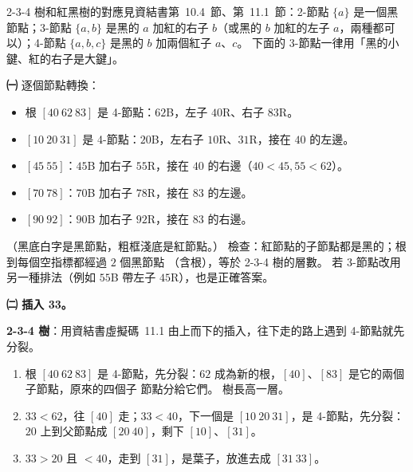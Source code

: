 \begin{pastsoln}
2-3-4 樹和紅黑樹的對應見資結書第~10.4~節、第~11.1~節：2-節點 $\{a\}$ 是一個黑節點；3-節點 $\{a, b\}$ 是黑的
$a$ 加紅的右子 $b$（或黑的 $b$ 加紅的左子 $a$，兩種都可以）；4-節點 $\{a, b, c\}$ 是黑的 $b$ 加兩個紅子
$a$、$c$。 下面的 3-節點一律用「黑的小鍵、紅的右子是大鍵」。

\textbf{㈠} 逐個節點轉換：
\begin{itemize}
\item 根 $[40\ 62\ 83]$ 是 4-節點：$62$B，左子 $40$R、右子 $83$R。
\item $[10\ 20\ 31]$ 是 4-節點：$20$B，左右子 $10$R、$31$R，接在 $40$ 的左邊。
\item $[45\ 55]$：$45$B 加右子 $55$R，接在 $40$ 的右邊（$40 < 45, 55 < 62$）。
\item $[70\ 78]$：$70$B 加右子 $78$R，接在 $83$ 的左邊。
\item $[90\ 92]$：$90$B 加右子 $92$R，接在 $83$ 的右邊。
\end{itemize}
\begin{center}
\end{center}
（黑底白字是黑節點，粗框淺底是紅節點。） 檢查：紅節點的子節點都是黑的；根到每個空指標都經過 $2$ 個黑節點
（含根），等於 2-3-4 樹的層數。 若 3-節點改用另一種排法（例如 $55$B 帶左子 $45$R），也是正確答案。

\textbf{㈡ 插入 33。}

\textbf{2-3-4 樹}：用資結書虛擬碼~11.1 由上而下的插入，往下走的路上遇到 4-節點就先分裂。
\begin{enumerate}
\item 根 $[40\ 62\ 83]$ 是 4-節點，先分裂：$62$ 成為新的根，$[40]$、$[83]$ 是它的兩個子節點，原來的四個子
節點分給它們。 樹長高一層。
\item $33 < 62$，往 $[40]$ 走；$33 < 40$，下一個是 $[10\ 20\ 31]$，是 4-節點，先分裂：$20$ 上到父節點成
$[20\ 40]$，剩下 $[10]$、$[31]$。
\item $33 > 20$ 且 $< 40$，走到 $[31]$，是葉子，放進去成 $[31\ 33]$。
\end{enumerate}


\end{pastsoln}

